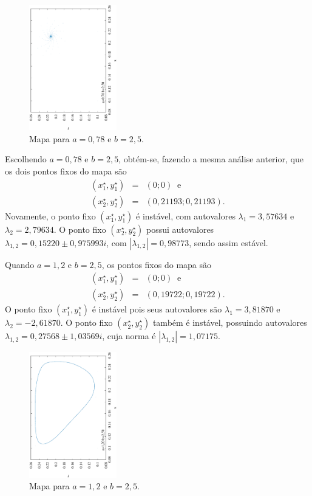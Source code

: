 \documentclass[brazilian, 12pt, a4paper, final]{article}
\begin{document}
\begin{multicols*}{2}
\begin{figure}[H] 
  \centering
  \includegraphics[width=0.34\textwidth,angle=-90]{mapa_a078_b250.eps}
  \caption{Mapa para $a=0,78$ e $b=2,5$.}
  \label{fig:078}
\end{figure}

Escolhendo $a=0,78$ e $b=2,5$, obtém-se, fazendo a mesma análise anterior, que os dois pontos fixos do mapa são
\begin{eqnarray}
	\nonumber (x^{\star}_1,y^{\star}_1)&=&(0; 0) \;\; \mathrm{e} \\
	\nonumber (x^{\star}_2,y^{\star}_2)&=&(0,21193; 0,21193).
\end{eqnarray}
Novamente, o ponto fixo $(x^{\star}_1,y^{\star}_1)$ é instável, com autovalores $\lambda_1=3,57634$ e $\lambda_2=2,79634$. O ponto fixo $(x^{\star}_2,y^{\star}_2)$ possui autovalores $\lambda_{1,2}=0,15220\pm 0,975993i$, com $|\lambda_{1,2}|=0,98773$, sendo assim estável.

Quando $a=1,2$ e $b=2,5$, os pontos fixos do mapa são
\begin{eqnarray}
	\nonumber (x^{\star}_1,y^{\star}_1)&=&(0; 0) \;\; \mathrm{e} \\
	\nonumber (x^{\star}_2,y^{\star}_2)&=&(0,19722; 0,19722).
\end{eqnarray}
O ponto fixo $(x^{\star}_1,y^{\star}_1)$ é instável pois seus autovalores são $\lambda_1=3,81870$ e $\lambda_2=-2,61870$. O ponto fixo $(x^{\star}_2,y^{\star}_2)$ também é instável, possuindo autovalores $\lambda_{1,2}=0,27568\pm1,03569i$, cuja norma é $|\lambda_{1,2}|=1,07175$.

\begin{figure}[H] 
  \centering
  \includegraphics[width=0.34\textwidth,angle=-90]{mapa_a120_b250.eps}
  \caption{Mapa para $a=1,2$ e $b=2,5$.}
  \label{fig:120}
\end{figure}


\end{multicols*}
\end{document}
